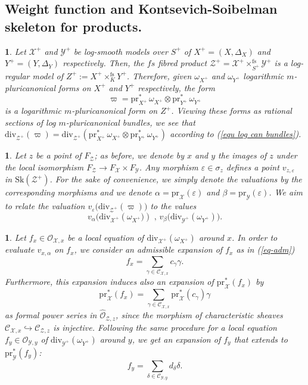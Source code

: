 \documentclass{amsart}%
\numberwithin{equation}{subsection}
\theoremstyle{plain2}
\theoremstyle{definition2}
\theoremstyle{stepstyle}
\theoremstyle{point}
\theoremstyle{subpoint}
\newtheorem{subpoint}[equation]{}%
\newcommand{\spa}[1]{\begin{subpoint}#1\end{subpoint}}           %
\newcommand{\cX}{\ensuremath{\mathscr{X}}}
\newcommand{\caC}{\ensuremath{\mathcal{C}}}
\newcommand{\caO}{\ensuremath{\mathcal{O}}}
\newcommand{\cY}{\ensuremath{\mathscr{Y}}}
\newcommand{\cZ}{\ensuremath{\mathscr{Z}}}
\renewcommand{\cZ}{\ensuremath{\mathscr{Z}}}
\renewcommand{\cY}{\ensuremath{\mathscr{Y}}}
\newcommand{\pr}{\mathrm{pr}}
\newcommand{\divisor}{\mathrm{div}}
\newcommand{\Sk}{\mathrm{Sk}}
\begin{document}
\subsection{Weight function and Kontsevich-Soibelman skeleton for products.} \label{paragraph weight function product}
\spa{Let $\cX^+$ and $\cY^+$ be log-smooth models over $S^+$ of $X^+=(X,\Delta_X)$ and $Y^+=(Y,\Delta_Y)$ respectively. Then, the $fs$ fibred product $\cZ^+=\cX^+  \times^{\text{fs}}_{S^+} \cY^+$ is a log-regular model of $Z^+:=X^+ \times^{\text{fs}}_K Y^+$. Therefore, given $\omega_{X^+}$ and $\omega_{Y^+}$ logarithmic $m$-pluricanonical forms on $X^+$ and $Y^+$ respectively, the form $$\varpi=\pr_{X^+}^* \,\omega_{X^+} \otimes \pr_{Y^+}^* \,\omega_{Y^+}$$ is a logarithmic $m$-pluricanonical form on $Z^+$. Viewing these forms as rational sections of log $m$-pluricanonical bundles, we see that $\divisor_{\cZ^+}(\varpi)=\divisor_{\cZ^+}( \pr_{X^+}^* \,\omega_{X^+} \otimes \pr_{Y^+}^* \,\omega_{Y^+})$ according to (\ref{equ log can bundles}).}

\spa{Let $z$ be a point of $F_{\cZ}$; as before, we denote by $x$ and $y$ the images of $z$ under the local isomorphism $F_{\cZ} \rightarrow F_{\cX} \times F_{\cY}$. Any morphism $\varepsilon \in \sigma_z$ defines a point $v_{z,\varepsilon}$ in $\Sk(\cZ^+)$. For the sake of convenience, we simply denote the valuations by the corresponding morphisms and we denote $\alpha= \pr_{\cX}(\varepsilon)$ and $\beta=\pr_{\cY}(\varepsilon)$. We aim to relate the valuation $v_{\varepsilon}\big(\divisor_{\cZ^+}(\varpi)\big)$ to the values $$v_{\alpha}\big(\divisor_{\cX^+}(\omega_{X^+}\big)) \text{ , } v_{\beta}\big(\divisor_{\cY^+}(\omega_{Y^+})\big).$$}

\spa{Let $f_x \in \caO_{\cX,x}$ be a local equation of $\divisor_{\cX^+}(\omega_{X^+})$ around $x$. In order to evaluate $v_{x,\alpha}$ on $f_x$, we consider an admissible expansion of $f_x$ as in (\ref{eq-adm}) $$f_x=\sum_{\gamma\in \caC_{\cX,x}}c_\gamma \gamma.$$ Furthermore, this expansion induces also an expansion of $\pr_{\cX}^*(f_x)$ by  $$\pr_{\cX}^*(f_x)=\sum_{\gamma\in \caC_{\cX,x} }\pr^*_{\cX}(c_\gamma) \gamma$$ as formal power series in $\widehat{\caO}_{\cZ,z}$, since the morphism of characteristic sheaves $\mathcal{C}_{\cX,x} \hookrightarrow \mathcal{C}_{\cZ,z}$ is injective. Following the same procedure for a local equation $f_y \in \caO_{\cY,y}$ of $\divisor_{\cY^+}(\omega_{Y^+})$ around $y$, we get an expansion of $f_y$ that extends to $\pr_{\cY}^*(f_y)$: 
$$f_y=\sum_{\delta\in \caC_{\cY,y}}d_\delta \delta.$$}
\end{document}
